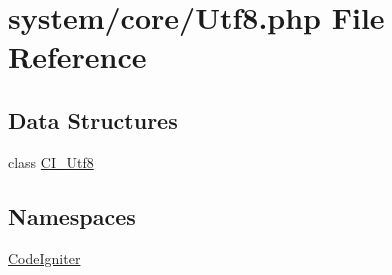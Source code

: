 \hypertarget{_utf8_8php}{}\section{system/core/\+Utf8.php File Reference}
\label{_utf8_8php}
\subsection*{Data Structures}
\begin{DoxyCompactItemize}
\item 
class \mbox{\hyperlink{class_c_i___utf8}{C\+I\+\_\+\+Utf8}}
\end{DoxyCompactItemize}
\subsection*{Namespaces}
\begin{DoxyCompactItemize}
\item 
 \mbox{\hyperlink{namespace_code_igniter}{Code\+Igniter}}
\end{DoxyCompactItemize}
